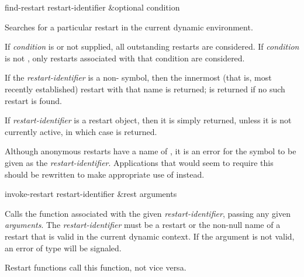 \begin{defun}[Function]
find-restart restart-identifier &optional condition

  Searches for a particular restart in the current dynamic environment.

If {\it condition} is  or not supplied, all outstanding restarts
are considered.
If {\it condition} is not , only restarts associated
with that condition are considered.

  If the {\it restart-identifier} is a non-
  symbol, then the innermost (that is, most recently
  established) restart with that name is returned;   is returned if no
  such restart is found.

  If {\it restart-identifier} is a restart object, then it is simply returned,
  unless it is not currently active, in which case  is returned.

  Although anonymous restarts have a name of , it is an error for
  the symbol  to be given as the {\it restart-identifier}.  Applications that 
  would seem to require this should be rewritten to make appropriate use 
  of  instead.
\end{defun}

\begin{defun}[Function]
invoke-restart restart-identifier &rest arguments

  Calls the function associated with the given {\it restart-identifier}, passing any given
  {\it arguments}. The {\it restart-identifier} must be a restart or the non-null name of a
  restart that is valid in the current dynamic context. If the argument
  is not valid, an error of type  will be signaled.

  \beforenoterule
  \begin{implementation}
  Restart functions call this function, not vice versa.
  \end{implementation}
  \afternoterule
\end{defun}

